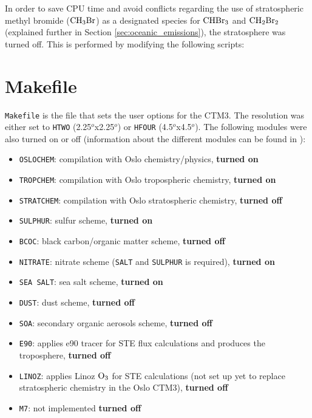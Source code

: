 In order to save CPU time and avoid conflicts regarding the use of stratospheric methyl bromide ($\mathrm{CH_3Br}$) as a designated species for $\mathrm{CHBr_3}$ and $\mathrm{CH_2Br_2}$ (explained further in Section \ref{sec:oceanic_emissions}), the stratosphere was turned off. This is performed by modifying the following scripts: 

\section{Makefile}\label{subsubsec:makefile}

\texttt{Makefile} is the file that sets the user options for the CTM3. The resolution was either set to \texttt{HTWO} (2.25$^o$x2.25$^o$) or \texttt{HFOUR} (4.5$^o$x4.5$^o$). The following modules were also turned on or off (information about the different modules can be found in \cite{SovdeManual}):

\begin{itemize}
    \item \texttt{OSLOCHEM}: compilation with Oslo chemistry/physics, \textbf{turned on}
    \item \texttt{TROPCHEM}: compilation with Oslo tropospheric chemistry, \textbf{turned on}
    \item \texttt{STRATCHEM}: compilation with Oslo stratospheric chemistry, \textbf{turned off}
    \item \texttt{SULPHUR}: sulfur scheme, \textbf{turned on}
    \item \texttt{BCOC}: black carbon/organic matter scheme, \textbf{turned off}
    \item \texttt{NITRATE}: nitrate scheme (\texttt{SALT} and \texttt{SULPHUR} is required), \textbf{turned on}
    \item \texttt{SEA SALT}: sea salt scheme, \textbf{turned on}
    \item \texttt{DUST}: dust scheme, \textbf{turned off}
    \item \texttt{SOA}: secondary organic aerosols scheme, \textbf{turned off}
    \item \texttt{E90}: applies e90 tracer for STE flux calculations and produces the troposphere, \textbf{turned off}
    \item \texttt{LINOZ}: applies Linoz $\mathrm{O_3}$ for STE calculations (not set up yet to replace stratospheric chemistry in the Oslo CTM3), \textbf{turned off}
    \item \texttt{M7}: not implemented \textbf{turned off}
\end{itemize}


